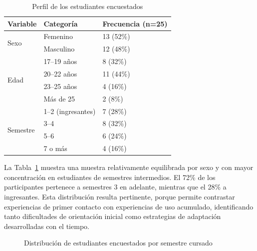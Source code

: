 \begin{table}[H]
\centering
\begin{tabular}{|p{3.5cm}|p{5.8cm}|p{4cm}|}
\hline
\textbf{Variable} & \textbf{Categoría} & \textbf{Frecuencia (n=25)} \\
\hline
\multirow{2}{*}{Sexo}
  & Femenino  & 13 (52\%) \\
  & Masculino & 12 (48\%) \\
\hline
\multirow{4}{*}{Edad}
  & 17--19 años  & 8 (32\%)  \\
  & 20--22 años  & 11 (44\%) \\
  & 23--25 años  & 4 (16\%)  \\
  & Más de 25    & 2 (8\%)   \\
\hline
\multirow{4}{*}{Semestre}
  & 1--2 (ingresantes) & 7 (28\%)  \\
  & 3--4               & 8 (32\%)  \\
  & 5--6               & 6 (24\%)  \\
  & 7 o más            & 4 (16\%)  \\
\hline
\end{tabular}
\caption{Perfil de los estudiantes encuestados}
\label{tab:perfil-encuestados}
\end{table}

La Tabla~\ref{tab:perfil-encuestados} muestra una muestra relativamente equilibrada por sexo y con mayor concentración en estudiantes de semestres intermedios. El 72\% de los participantes pertenece a semestres 3 en adelante, mientras que el 28\% a ingresantes. Esta distribución resulta pertinente, porque permite contrastar experiencias de primer contacto con experiencias de uso acumulado, identificando tanto dificultades de orientación inicial como estrategias de adaptación desarrolladas con el tiempo.
 
\begin{figure}[H]
\centering
{}
\caption{Distribución de estudiantes encuestados por semestre cursado}
\label{fig:dist-semestre}
\end{figure}

